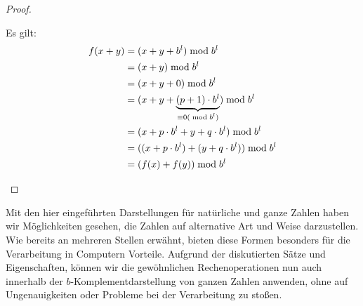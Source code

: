 \documentclass{article}
\begin{document}
\begin{proof}
\begin{description}
          Es gilt:
          \begin{align*}
            f(x+y) &= (x+y+b^l) \bmod b^l \\
            &= (x+y) \bmod b^l \\
            &= (x+y+0) \bmod b^l \\
            &= (x+y+ \underbrace{(p+1)\cdot b^l}_{\mathclap{\equiv 0 (\bmod b^l)}}) \bmod b^l \\
            &= (x+ p\cdot b^l + y + q\cdot b^l) \bmod b^l \\
            &= ((x + p \cdot b^l) + (y + q\cdot b^l)) \bmod b^l \\
            &= (f(x) + f(y)) \bmod b^l
          \end{align*}
      \end{description}
    \end{proof}

  \vspace{\baselineskip}

  Mit den hier eingeführten Darstellungen für natürliche und ganze Zahlen haben wir Möglichkeiten gesehen, die Zahlen auf alternative Art und Weise darzustellen.
  Wie bereits an mehreren Stellen erwähnt, bieten diese Formen besonders für die Verarbeitung in Computern Vorteile.
  Aufgrund der diskutierten Sätze und Eigenschaften, können wir die gewöhnlichen Rechenoperationen nun auch innerhalb der $b$-Komplementdarstellung von ganzen Zahlen anwenden, ohne auf Ungenauigkeiten oder Probleme bei der Verarbeitung zu stoßen.

\newpage
\printbibliography[heading=bibintoc]
\end{document}
